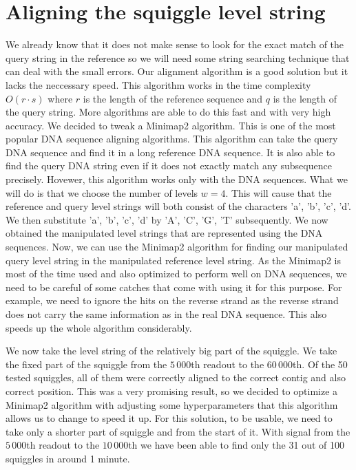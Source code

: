 \section{Aligning the squiggle level string}

We already know that it does not make sense to look for the exact match of the query string in the reference
so we will need some string searching technique that can deal with the small errors.
Our alignment algorithm is a good solution but it lacks the neccessary speed. This
algorithm works in the time complexity $O(r\cdot s)$ where $r$ is the length of the
reference sequence and $q$ is the length of the query string. More algorithms are able
to do this fast and with very high accuracy. We decided to tweak a Minimap2 \cite{li2018minimap2} algorithm. This is
one of the most popular DNA sequence aligning algorithms. This algorithm can take the
query DNA sequence and find it in a long reference DNA sequence. It is also able to
find the query DNA string even if it does not exactly match any subsequence precisely.
Hovewer, this algorithm works only with the DNA sequences. What we will do is that we choose
the number of levels $w=4$. This will cause that the reference and query level strings will both consist of
the characters 'a', 'b', 'c', 'd'. We then substitute 'a', 'b', 'c', 'd' by
'A', 'C', 'G', 'T' subsequently. We now obtained the manipulated level strings that
are represented using the DNA sequences. Now, we can use the Minimap2 algorithm for
finding our manipulated query level string in the manipulated reference level string.
As the Minimap2 is most of the time used and also optimized to perform well on DNA
sequences, we need to be careful of some catches that come with using it for this
purpose. For example, we need to ignore the hits on the reverse strand as the
reverse strand does not carry the same information as in the real DNA sequence.
This also speeds up the whole algorithm considerably.

We now take the level string of the relatively big part of the squiggle. We take the
fixed part of the squiggle from the $5\,000$th readout to the $60\,000$th. Of the 50
tested squiggles, all of them were correctly aligned to the correct contig and also
correct position. This was a very promising result, so we decided to optimize a
Minimap2 algorithm with adjusting some hyperparameters that this algorithm allows us
to change to speed it up. For this solution, to be usable, we need to take only
a shorter part of squiggle and from the start of it. With signal from the $5\,000$th
readout to the $10\,000$th we have been able to find only the 31 out of 100 squiggles
in around 1 minute.
